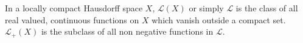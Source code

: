 In a locally compact Hausdorff space $X$, $\mathcal{L}(X)$ or simply $\mathcal{L}$ is the class of all real valued, continuous functions on $X$ which vanish outside a compact set. $\mathcal{L}_+(X)$ is the subclass of all non negative functions in $\mathcal{L}$.
